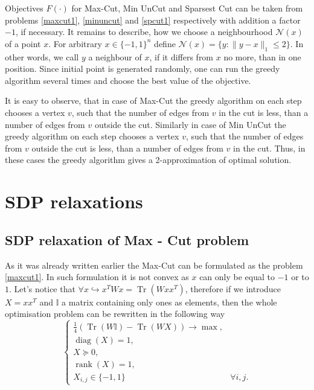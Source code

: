 \documentclass[12pt]{article}
\DeclareMathOperator{\trace}{Tr}
\DeclareMathOperator{\diag}{diag}
\DeclareMathOperator{\rank}{rank}
\begin{document}
Objectives $F(\cdot)$ for Max-Cut, Min UnCut and Sparsest Cut can be taken from 
problems \ref{maxcut1}, \ref{minuncut} and \ref{spcut1}  respectively with addition a 
factor $-1$, if necessary.
It remains to describe, how we choose a neighbourhood $\mathcal N(x)$ of a point $x$.
For arbitrary $x \in \{-1, 1 \}^n$ define $\mathcal N(x) = \{ y : \| y - x \|_1 \leq 2 \}$.
In other words, we call $y$ a neighbour of $x$, if it differs from $x$ no more, than in one 
position.
Since initial point is generated randomly, one can run the greedy algorithm several times 
and choose the best value of the objective.

It is easy to observe, that in case of Max-Cut the greedy algorithm on each step chooses 
a vertex $v$, such that the number of edges from $v$ in the cut is less, than a number of 
edges from $v$ outside the cut.
Similarly in case of Min UnCut the greedy algorithm on each step chooses 
a vertex $v$, such that the number of edges from $v$ outside the cut is less, than a 
number of edges from $v$ in the cut.
Thus, in these cases the greedy algorithm gives a 2-approximation of optimal solution.





\section{SDP relaxations}

\subsection{SDP relaxation of Max - Cut problem}

As it was already written earlier the Max-Cut can be formulated as the problem \ref{maxcut1}. In such formulation it is not convex as $x$ can only be equal to $-1$ or to $1$. Let's notice that $\forall x \hookrightarrow x^TWx = \trace (W xx^T) $, therefore if we introduce $X = xx^T$ and $\mathbb{I}$ a matrix containing only ones as elements, then the whole optimisation problem can be rewritten in the following way
\[
    \begin{cases}
        \frac 14 \left(\trace(W \mathbb{I}) - \trace(W X)\right) \longrightarrow \max,  &\\
        \diag(X) = 1, &\\
        X \succeq 0, &\\
        \rank(X) = 1,  &\\
        X_{i,j} \in \{-1,1\} & \forall i, j.
    \end{cases}
\]
\end{document}
